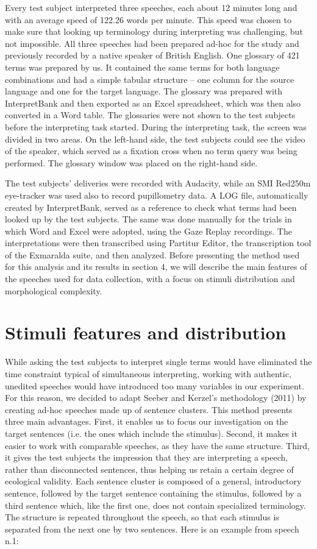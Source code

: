 \documentclass[output=paper]{langsci/langscibook}
\begin{document}
Every test subject interpreted three speeches, each about 12 minutes long and with an average speed of 122.26 words per minute. This speed was chosen to make sure that looking up terminology during interpreting was challenging, but not impossible. All three speeches had been prepared ad-hoc for the study and previously recorded by a native speaker of British English. One glossary of 421 terms was prepared by us. It contained the same terms for both language combinations and had a simple tabular structure – one column for the source language and one for the target language. The glossary was prepared with InterpretBank and then exported as an Excel spreadsheet, which was then also converted in a Word table. The glossaries were not shown to the test subjects before the interpreting task started. During the interpreting task, the screen was divided in two areas. On the left-hand side, the test subjects could see the video of the speaker, which served as a fixation cross when no term query was being performed. The glossary window was placed on the right-hand side.

The test subjects’ deliveries were recorded with Audacity, while an SMI Red250m eye-tracker was used also to record pupillometry data. A LOG file, automatically created by InterpretBank, served as a reference to check what terms had been looked up by the test subjects. The same was done manually for the trials in which Word and Excel were adopted, using the Gaze Replay recordings. The interpretations were then transcribed using Partitur Editor, the transcription tool of the Exmaralda suite, and then analyzed. Before presenting the method used for this analysis and its results in section 4, we will describe the main features of the speeches used for data collection, with a focus on stimuli distribution and morphological complexity.

\section{Stimuli features and distribution}

While asking the test subjects to interpret single terms would have eliminated the time constraint typical of simultaneous interpreting, working with authentic, unedited speeches would have introduced too many variables in our experiment. For this reason, we decided to adapt Seeber and Kerzel’s methodology (2011) by creating ad-hoc speeches made up of sentence clusters. This method presents three main advantages. First, it enables us to focus our investigation on the target sentences (i.e. the ones which include the stimulus). Second, it makes it easier to work with comparable speeches, as they have the same structure. Third, it gives the test subjects the impression that they are interpreting a speech, rather than disconnected sentences, thus helping us retain a certain degree of ecological validity. Each sentence cluster is composed of a general, introductory sentence, followed by the target sentence containing the stimulus, followed by a third sentence which, like the first one, does not contain specialized terminology. The structure is repeated throughout the speech, so that each stimulus is separated from the next one by two sentences. Here is an example from speech n.1:
\end{document}
